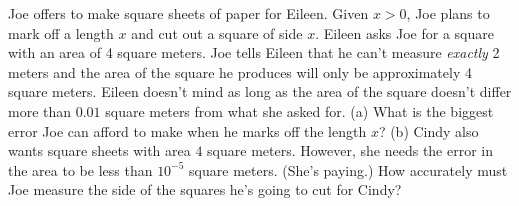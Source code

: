 Joe offers to make square sheets of paper for
Eileen.  Given $x>0$, Joe plans to mark off a length $x$ and cut out a
square of side $x$.  Eileen asks Joe for a square with an area of 4 square
meters.  Joe tells Eileen that he can't measure \emph{exactly} 2 meters and
the area of the square he produces will only be approximately 4 square
meters.  Eileen doesn't mind as long as the area of the square doesn't
differ more than $0.01$ square meters from what she asked for.\hwendpart
%
(a) What is the biggest error Joe can afford to make when he
marks off the length $x$?
%
(b) Cindy also wants square sheets with area $4$ square meters.
However, she needs the error in the area to be less than $10^{-5}$
square meters.  (She's paying.)
How accurately must Joe measure the side of the squares he's going to cut
for Cindy?

